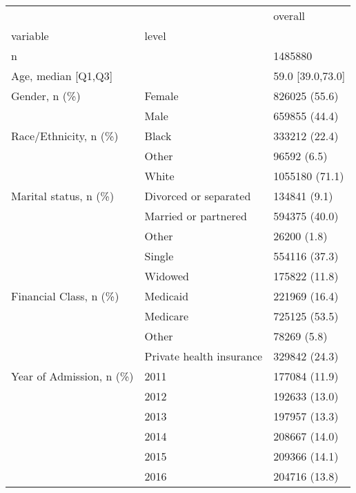 \begin{tabular}{lll}
\toprule
                                       &   &            overall \\
variable & level &                    \\
\midrule
n &   &            1485880 \\
Age, median [Q1,Q3] &   &   59.0 [39.0,73.0] \\
Gender, n (\%) & Female &      826025 (55.6) \\
                                       & Male &      659855 (44.4) \\
Race/Ethnicity, n (\%) & Black &      333212 (22.4) \\
                                       & Other &        96592 (6.5) \\
                                       & White &     1055180 (71.1) \\
Marital status, n (\%) & Divorced or separated &       134841 (9.1) \\
                                       & Married or partnered &      594375 (40.0) \\
                                       & Other &        26200 (1.8) \\
                                       & Single &      554116 (37.3) \\
                                       & Widowed &      175822 (11.8) \\
Financial Class, n (\%) & Medicaid &      221969 (16.4) \\
                                       & Medicare &      725125 (53.5) \\
                                       & Other &        78269 (5.8) \\
                                       & Private health insurance &      329842 (24.3) \\
Year of Admission, n (\%) & 2011 &      177084 (11.9) \\
                                       & 2012 &      192633 (13.0) \\
                                       & 2013 &      197957 (13.3) \\
                                       & 2014 &      208667 (14.0) \\
                                       & 2015 &      209366 (14.1) \\
                                       & 2016 &      204716 (13.8) \\

\end{tabular}
